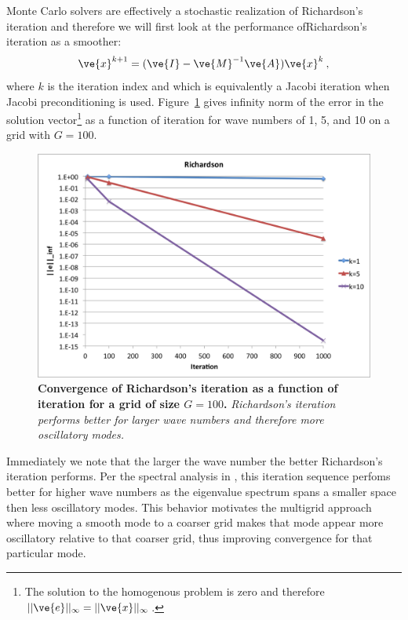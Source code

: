 \documentclass[note]{TechNote}
\begin{document}
Monte Carlo solvers are effectively a stochastic realization of
Richardson's iteration and therefore we will first look at the
performance ofRichardson's iteration as a smoother:
\begin{equation}
  \ve{x}^{k+1} = (\ve{I}-\ve{M}^{-1}\ve{A})\ve{x}^k\:,
\end{equation}
where $k$ is the iteration index and which is equivalently a Jacobi
iteration when Jacobi preconditioning is
used. Figure~\ref{fig:richardson} gives infinity norm of the error in
the solution vector\footnote{The solution to the homogenous problem is
  zero and therefore $||\ve{e}||_{\infty} = ||\ve{x}||_{\infty}$.} as
a function of iteration for wave numbers of 1, 5, and 10 on a grid
with $G = 100$.
\begin{figure}[h!]
  \begin{center}
    \includegraphics[width=5in]{richardson.png}
  \end{center}
  \caption{\textbf{Convergence of Richardson's iteration as a function
      of iteration for a grid of size $G = 100$.} \textit{Richardson's
      iteration performs better for larger wave numbers and therefore
      more oscillatory modes.}}
  \label{fig:richardson}
\end{figure}
Immediately we note that the larger the wave number the better
Richardson's iteration performs. Per the spectral analysis in
\cite{briggs_multigrid}, this iteration sequence perfoms better for
higher wave numbers as the eigenvalue spectrum spans a smaller space
then less oscillatory modes. This behavior motivates the multigrid
approach where moving a smooth mode to a coarser grid makes that mode
appear more oscillatory relative to that coarser grid, thus improving
convergence for that particular mode.
\end{document}
